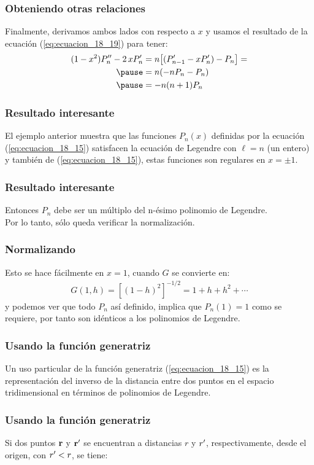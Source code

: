 \documentclass[12pt]{beamer}
\begin{document}
\begin{frame}
\frametitle{Obteniendo otras relaciones}
Finalmente, derivamos ambos lados con respecto a $x$ y usamos el resultado de la ecuación (\ref{eq:ecuacion_18_19}) para tener:
\begin{eqnarray*}
\begin{aligned}
(1 - x^{2}) \sderivada{P}_{n} - 2 \, x \pderivada{P}_{n} &=  n \big[ (\pderivada{P}_{n-1} - x \pderivada{P}_{n}) - P_{n} \big] = \\ \pause
&= n (-n P_{n} - P_{n}) \\ \pause
&= -n (n+1) P_{n}
\end{aligned}
\end{eqnarray*}
\end{frame}
\begin{frame}
\frametitle{Resultado interesante}
El ejemplo anterior muestra que las funciones $P_{n} (x)$ definidas por la ecuación (\ref{eq:ecuacion_18_15}) satisfacen la ecuación de Legendre con $\ell = n$ (un entero) y también de (\ref{eq:ecuacion_18_15}), estas funciones son regulares en $x = \pm 1$.
\end{frame}
\begin{frame}
\frametitle{Resultado interesante}
Entonces $P_{n}$ debe ser un múltiplo del n-ésimo polinomio de Legendre.
\\
\bigskip
\pause
Por lo tanto, sólo queda verificar la normalización.
\end{frame}
\begin{frame}
\frametitle{Normalizando}
Esto se hace fácilmente en $x = 1$, cuando $G$ se convierte en:
\pause
\begin{align*}
G (1, h) = [(1 - h)^{2}]^{-1/2} =  1 + h + h^{2} + \cdots
\end{align*}
\pause
y podemos ver que todo $P_{n}$ así definido, implica que $P_{n} (1) = 1$ como se requiere, \pause por tanto son idénticos a los polinomios de Legendre.
\end{frame}
\begin{frame}
\frametitle{Usando la función generatriz}
Un uso particular de la función generatriz (\ref{eq:ecuacion_18_15}) es la representación del inverso de la distancia entre dos puntos en el espacio tridimensional en términos de polinomios de Legendre.
\end{frame}
\begin{frame}
\frametitle{Usando la función generatriz}
Si dos puntos $\vb{r}$ y $\vb{r}^{\prime}$ se encuentran a distancias $r$ y ${r}^{\prime}$, respectivamente, desde el origen, con ${r}^{\prime} < r$, se tiene:
\end{frame}
\end{document}
